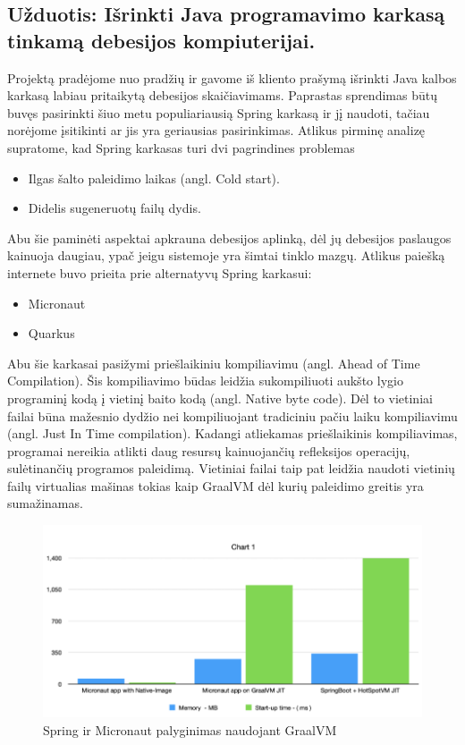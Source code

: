\documentclass{VUMIFPSkursinis}
\begin{document}
	\subsection{Užduotis: Išrinkti Java programavimo karkasą tinkamą debesijos kompiuterijai.}
		Projektą pradėjome nuo pradžių ir gavome iš kliento prašymą išrinkti Java kalbos karkasą labiau pritaikytą debesijos skaičiavimams.
		Paprastas sprendimas būtų buvęs pasirinkti šiuo metu populiariausią Spring karkasą ir jį naudoti, tačiau norėjome įsitikinti ar jis yra geriausias pasirinkimas.
		Atlikus pirminę analizę supratome, kad Spring karkasas turi dvi pagrindines problemas
		\begin{itemize}
			\item{Ilgas šalto paleidimo laikas (angl. Cold start).}
			\item{Didelis sugeneruotų failų dydis.}
		\end{itemize}
		Abu šie paminėti aspektai apkrauna debesijos aplinką, dėl jų debesijos paslaugos kainuoja daugiau, ypač jeigu sistemoje yra šimtai tinklo mazgų.
		Atlikus paiešką internete buvo prieita prie alternatyvų Spring karkasui:
		\begin{itemize}
			\item{Micronaut}
			\item{Quarkus}
		\end{itemize}
		Abu šie karkasai pasižymi priešlaikiniu kompiliavimu (angl. Ahead of Time Compilation).
		Šis kompiliavimo būdas leidžia sukompiliuoti aukšto lygio programinį kodą į vietinį baito kodą (angl. Native byte code).
		Dėl to vietiniai failai būna mažesnio dydžio nei kompiliuojant tradiciniu pačiu laiku kompiliavimu (angl. Just In Time compilation).
		Kadangi atliekamas priešlaikinis kompiliavimas, programai nereikia atlikti daug resursų kainuojančių refleksijos operacijų, sulėtinančių programos paleidimą.
		Vietiniai failai taip pat leidžia naudoti vietinių failų virtualias mašinas tokias kaip GraalVM dėl kurių paleidimo greitis yra sumažinamas.
			\begin{figure}[H]
			\includegraphics[scale=0.7]{img/three}
			\caption{Spring ir Micronaut palyginimas naudojant GraalVM} %
			\label{img:kurimoProcesas}
			\end{figure}
\end{document}
